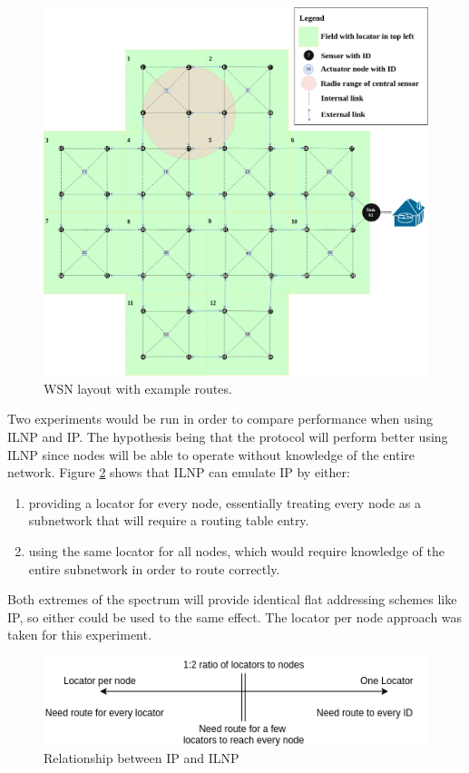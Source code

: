 \documentclass[12pt]{article}
\begin{document}
\begin{figure}[!ht]
	\centering
	\includegraphics[width=\linewidth]{images/layout}
	\caption{WSN layout with example routes.}
	\label{fig:layout}
\end{figure}

Two experiments would be run in order to compare performance when using ILNP and IP. The hypothesis being that the protocol will perform better using ILNP since nodes will be able to operate without knowledge of the entire network. Figure \ref{fig:spectrum} shows that ILNP can emulate IP by either:
\begin{enumerate}
	\item providing a locator for every node, essentially treating every node as a subnetwork that will require a routing table entry.
	\item using the same locator for all nodes, which would require knowledge of the entire subnetwork in order to route correctly.
\end{enumerate}

Both extremes of the spectrum will provide identical flat addressing schemes like IP, so either could be used to the same effect. The locator per node approach was taken for this experiment.

\begin{figure}[!ht]
	\centering
	\includegraphics[width=\linewidth]{images/spectrum}
	\caption{Relationship between IP and ILNP}
	\label{fig:spectrum}
\end{figure}
\end{document}

